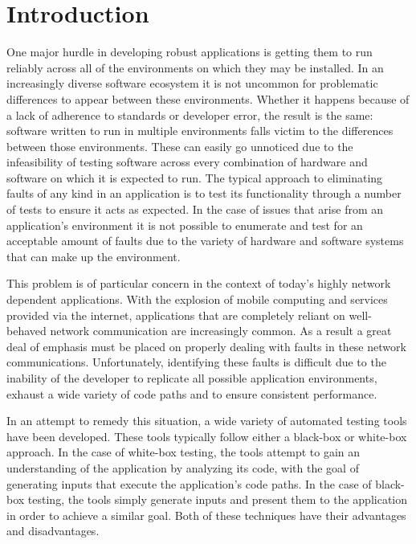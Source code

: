\section{Introduction}

One major hurdle in developing robust applications is getting them to run reliably across all of the environments on
which they may be installed.  In an increasingly diverse software ecosystem it is not uncommon for problematic
differences to appear between these environments.  Whether it happens because of a lack of adherence to standards or
developer error, the result is the same: software written to run in multiple environments falls victim to the
differences between those environments.  These can easily go unnoticed due to the infeasibility of testing software
across every combination of hardware and software on which it is expected to run.   The typical approach to eliminating
faults of any kind in an application is to test its functionality through a number of tests to ensure it acts as
expected.  In the case of issues that arise from an application's environment it is not possible to enumerate and test
for an acceptable amount of faults due to the variety of hardware and software systems that can make up the environment.

This problem is of particular concern in the context of today's highly network dependent applications.  With the
explosion of mobile computing and services provided via the internet, applications that are completely reliant on
well-behaved network communication are increasingly common.  As a result a great deal of emphasis must be placed on
properly dealing with faults in these network communications.  Unfortunately, identifying these faults is difficult due
to the inability of the developer to replicate all possible application environments, exhaust a wide variety of code
paths and to ensure consistent performance.

In an attempt to remedy this situation, a wide variety of automated testing tools have been developed.  These tools
typically follow either a black-box or white-box approach.  In the case of white-box testing, the tools attempt to gain
an understanding of the application by analyzing its code, with the goal of generating inputs that execute the
application's code paths.  In the case of black-box testing, the tools simply generate inputs and present them to the
application in order to achieve a similar goal.  Both of these techniques have their advantages and disadvantages.

